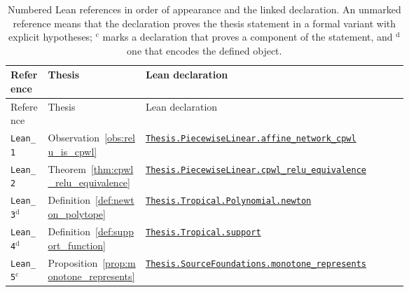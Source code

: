 {\small
\begin{longtable}{@{}l l >{\raggedright\arraybackslash}p{0.66\linewidth}@{}}
\caption[Lean references and their coverage]{Numbered Lean references in order of appearance and the linked declaration. An unmarked reference means that the declaration proves the thesis statement in a formal variant with explicit hypotheses; $^{\mathrm c}$ marks a declaration that proves a component of the statement, and $^{\mathrm d}$ one that encodes the defined object.}\label{tab:lean_coverage}\\
\toprule
Reference & Thesis & Lean declaration \\
\midrule
\endfirsthead
\toprule
Reference & Thesis & Lean declaration \\
\midrule
\endhead
\bottomrule
\endfoot
\texttt{Lean\_1} & Observation~\ref{obs:relu_is_cpwl} & \href{https://github.com/JayPiZimmermann/A-Structural-Approach-to-Explainable-Deep-Learning/blob/b1c18a7ed02eadd720b0b693794ba7e7dd2628f6/formalization/Thesis/PiecewiseLinear.lean\#L204}{\texttt{Thesis.\allowbreak PiecewiseLinear.\allowbreak affine\_network\_cpwl}} \\
\texttt{Lean\_2} & Theorem~\ref{thm:cpwl_relu_equivalence} & \href{https://github.com/JayPiZimmermann/A-Structural-Approach-to-Explainable-Deep-Learning/blob/b1c18a7ed02eadd720b0b693794ba7e7dd2628f6/formalization/Thesis/CPWLReLUEquivalence.lean\#L58}{\texttt{Thesis.\allowbreak PiecewiseLinear.\allowbreak cpwl\_relu\_equivalence}} \\
\texttt{Lean\_3}$^{\mathrm d}$ & Definition~\ref{def:newton_polytope} & \href{https://github.com/JayPiZimmermann/A-Structural-Approach-to-Explainable-Deep-Learning/blob/b1c18a7ed02eadd720b0b693794ba7e7dd2628f6/formalization/Thesis/Tropical.lean\#L41}{\texttt{Thesis.\allowbreak Tropical.\allowbreak Polynomial.\allowbreak newton}} \\
\texttt{Lean\_4}$^{\mathrm d}$ & Definition~\ref{def:support_function} & \href{https://github.com/JayPiZimmermann/A-Structural-Approach-to-Explainable-Deep-Learning/blob/b1c18a7ed02eadd720b0b693794ba7e7dd2628f6/formalization/Thesis/Tropical.lean\#L161}{\texttt{Thesis.\allowbreak Tropical.\allowbreak support}} \\
\texttt{Lean\_5}$^{\mathrm c}$ & Proposition~\ref{prop:monotone_represents} & \href{https://github.com/JayPiZimmermann/A-Structural-Approach-to-Explainable-Deep-Learning/blob/b1c18a7ed02eadd720b0b693794ba7e7dd2628f6/formalization/Thesis/SourceFoundationsStatements.lean\#L18}{\texttt{Thesis.\allowbreak SourceFoundations.\allowbreak monotone\_represents}} \\

\end{longtable}}
